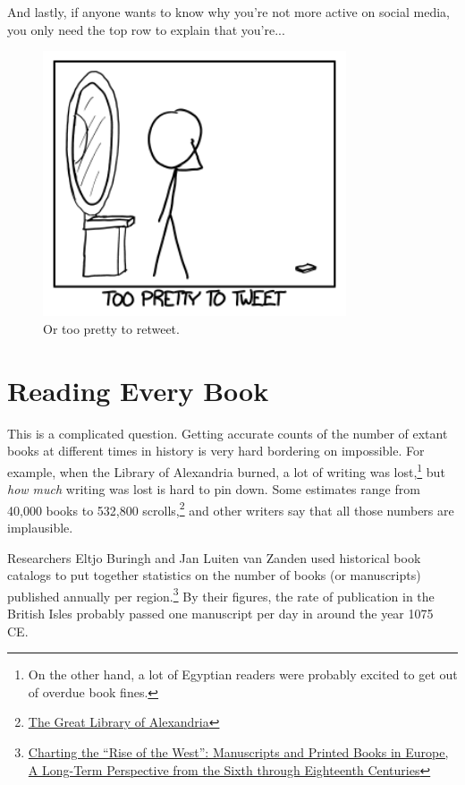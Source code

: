 {{And lastly, if anyone wants to know why you're not more active on social media, you only need the top row to explain that you're...}

\begin{figure}[!htbp]
\centering
\includegraphics[scale=0.5, max width=0.8\textwidth]{imgs/a/75/t9_tweet.png}
\caption{Or too pretty to retweet.}
\end{figure}

{
\chapter{Reading Every Book}
}

\hfill{}

{This is a complicated question. Getting accurate counts of the number of extant books at different times in history is very hard bordering on impossible. For example, when the Library of Alexandria burned, a lot of writing was lost,{\footnote{On the other hand, a lot of Egyptian readers were probably excited to get out of overdue book fines.} } but \emph{how much} writing was lost is hard to pin down. Some estimates range from 40,000 books to 532,800 scrolls,{\footnote{ \href{http://penelope.uchicago.edu/\~grout/encyclopaedia\_romana/greece/paganism/library.html}{The Great Library of Alexandria}} } and other writers say that all those numbers are implausible.}

{Researchers Eltjo Buringh and Jan Luiten van Zanden used historical book catalogs to put together statistics on the number of books (or manuscripts) published annually per region.{\footnote{ \href{http://vkc.library.uu.nl/vkc/seh/research/Lists/Research\%20Desk/Attachments/14/Charting\%20the\%20'Rise\%20of\%20the\%20West'.pdf}{Charting the “Rise of the West”: Manuscripts and Printed Books in Europe, A Long-Term Perspective from the Sixth through Eighteenth Centuries}} } By their figures, the rate of publication in the British Isles probably passed one manuscript per day in around the year 1075 CE.}

}
